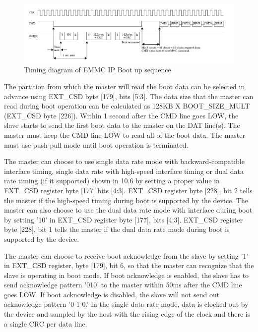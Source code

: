 \begin{figure}[H]
\begin{center}
\includegraphics[width=\textwidth]{images/BootUpSeqTiming.png}
\caption{Timing diagram of EMMC IP Boot up sequence}
\label{BootUpSeqTiming}
\end{center}
\end{figure}

The partition from which the master will read the boot data can be selected in advance using EXT\_CSD byte [179], bits [5:3]. The data size that the master can read during boot operation can be calculated as 128KB X BOOT\_SIZE\_MULT (EXT\_CSD byte [226]). Within 1 second after the CMD line goes LOW, the slave starts to send the first boot data to the master on the DAT line(s). The master must keep the CMD line LOW to read all of the boot data. The master must use push-pull mode until boot operation is terminated.

The master can choose to use single data rate mode with backward-compatible interface timing, single data rate with high-speed interface timing or dual data rate timing (if it supported) shown in 10.6 by setting a proper value in EXT\_CSD register byte [177] bits [4:3]. EXT\_CSD register byte [228], bit 2 tells the master if the high-speed timing during boot is supported by the device. The master can also choose to use the dual data rate mode with interface during boot by setting '10' in EXT\_CSD register byte [177], bits [4:3]. EXT\_CSD register byte [228], bit 1 tells the master if the dual data rate mode during boot is supported by the device.

The master can choose to receive boot acknowledge from the slave by setting '1' in EXT\_CSD register, byte [179], bit 6, so that the master can recognize that the slave is operating in boot mode. If boot acknowledge is enabled, the slave has to send acknowledge pattern '010' to the master within 50ms after the CMD line goes LOW. If boot acknowledge is disabled, the slave will not send out acknowledge pattern '0-1-0.' In the single data rate mode, data is clocked out by the device and sampled by the host with the rising edge of the clock and there is a single CRC per data line.

